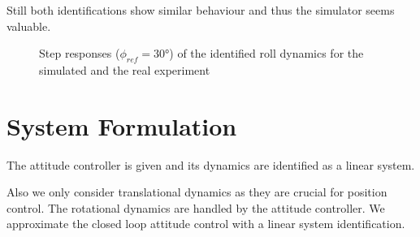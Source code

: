 Still both identifications show similar behaviour and thus the simulator seems valuable.
\begin{figure} 
\centering 
 
\caption{Step responses ($\phi_{ref} = 30 \si{\degree}$) of the identified roll dynamics for the simulated and the real experiment} 
\label{fig:sys_id_step_response} 
\end{figure}

\section{System Formulation}


The attitude controller is given and its dynamics are identified as a linear system.


Also we only consider translational dynamics as they are crucial for position control. The rotational dynamics are handled by the attitude controller. We approximate the closed loop attitude control with a linear system identification.
